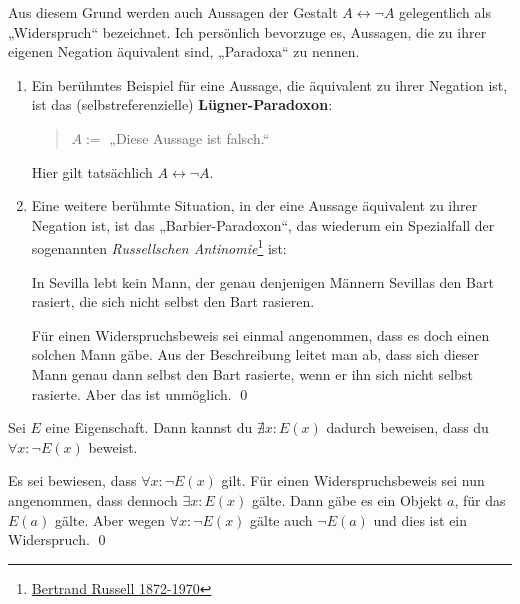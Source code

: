\begin{bsp}[*] \label{bsp:paradox}
    Aus diesem Grund werden auch Aussagen der Gestalt $A\leftrightarrow \neg A$ gelegentlich als „Widerspruch“ bezeichnet.  Ich persönlich bevorzuge es, Aussagen, die zu ihrer eigenen Negation äquivalent sind, „Paradoxa“ zu nennen.
    \begin{enumerate}
        \item Ein berühmtes Beispiel für eine Aussage, die äquivalent zu ihrer Negation ist, ist das (selbstreferenzielle) \textbf{Lügner-Paradoxon}:
        \begin{quote}
            $A:=$ „Diese Aussage ist falsch.“
        \end{quote}
        Hier gilt tatsächlich $A\leftrightarrow \neg A$.
        \item Eine weitere berühmte Situation, in der eine Aussage äquivalent zu ihrer Negation ist, ist das „Barbier-Paradoxon“, das wiederum ein Spezialfall der sogenannten \emph{Russellschen Antinomie}\footnote{\href{https://de.wikipedia.org/wiki/Bertrand_Russell}{Bertrand Russell 1872-1970}} ist:
        \begin{satz}
            In Sevilla lebt kein Mann, der genau denjenigen Männern Sevillas den Bart rasiert, die sich nicht selbst den Bart rasieren.
        \end{satz}
        \begin{bew}
            Für einen Widerspruchsbeweis sei einmal angenommen, dass es doch einen solchen Mann gäbe. Aus der Beschreibung leitet man ab, dass sich dieser Mann genau dann selbst den Bart rasierte, wenn er ihn sich nicht selbst rasierte. Aber das ist unmöglich. \qed
        \end{bew}
    \end{enumerate}
    
\end{bsp}

  
\begin{satz} \label{existenzwiderleg}
    Sei $E$ eine Eigenschaft. Dann kannst du $\nexists x: E(x)$ dadurch beweisen, dass du $\forall x: \neg E(x)$ beweist.
\end{satz}


\begin{bew}
    Es sei bewiesen, dass $\forall x: \neg E(x)$ gilt. Für einen Widerspruchsbeweis sei nun angenommen, dass dennoch $\exists x: E(x)$ gälte. Dann gäbe es ein Objekt $a$, für das $E(a)$ gälte. Aber wegen $\forall x: \neg E(x)$ gälte auch $\neg E(a)$ und dies ist ein Widerspruch. \qed
\end{bew}


